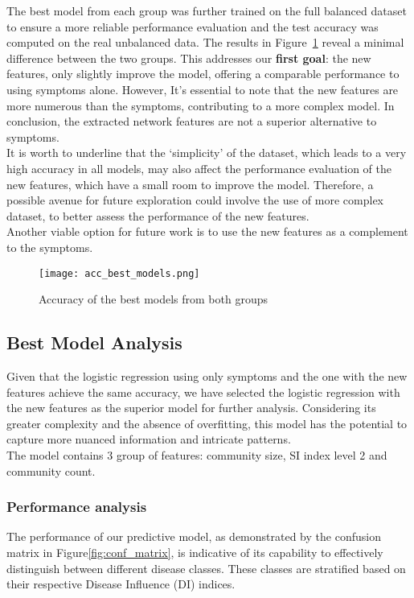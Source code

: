 \noindent
The best model from each group was further trained on the full balanced dataset to ensure a more reliable
performance evaluation and the test accuracy was computed on the real unbalanced data.
The results in Figure~\ref{fig:acc_best_models} reveal a minimal difference between
the two groups. This addresses our \textbf{first goal}: the new features, only slightly improve the model,
offering a comparable performance to using symptoms alone. However, It's essential to note that the new features are
more numerous than the symptoms, contributing to a more complex model. In conclusion, the extracted network
features are not a superior alternative to symptoms.\\
It is worth to underline that the `simplicity' of the dataset, which leads to a very high accuracy in all models, may also affect the performance
evaluation of the new features, which have a small room to improve the model. Therefore, a possible avenue
for future exploration could involve the use of more complex dataset, to better assess the performance of the
new features.\\
Another viable option for future work is to use the new features as a complement to the symptoms.




\begin{figure}[h]
	\centering
	\texttt{[image: acc\_best\_models.png]}
	\caption{Accuracy of the best models from both groups}\label{fig:acc_best_models}
\end{figure}




\subsection{Best Model Analysis}
Given that the logistic regression using only symptoms and the one with the new features achieve the same accuracy,
we have selected the logistic regression with the new features as the superior model for further analysis.
Considering its greater complexity and the absence of overfitting,
this model has the potential to capture more nuanced information and intricate patterns.\\
The model contains 3 group of features: community size, SI index level 2 and community count.
\subsubsection*{Performance analysis}
The performance of our predictive model, as demonstrated by the confusion matrix in Figure\ref{fig:conf_matrix},
is indicative of its capability to effectively distinguish between different disease classes.
These classes are stratified based on their respective Disease Influence (DI) indices.

